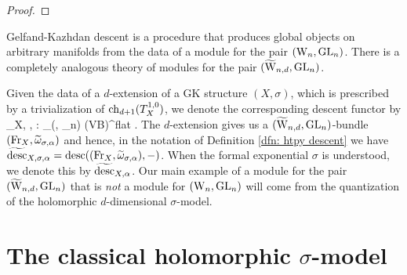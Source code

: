 \begin{proof}
\end{proof}

Gelfand-Kazhdan descent is a procedure that produces global objects on arbitrary manifolds from the data of a module for the pair $({{\rm W}_n}, {\rm GL}_n)$. 
There is a completely analogous theory of modules for the pair $(\widetilde{\rm W}_{n,d}, {\rm GL}_n)$. 

Given the data of a $d$-extension of a GK structure $(X, \sigma)$, which is prescribed by a trivialization of ${\rm ch}_{d+1}(T_X^{1,0})$, we denote the corresponding descent functor by
\ben
\Tilde{\desc}_{X, \sigma, \alpha} : \Mod_{(\TVectd, \GL_n)} (VB)^{flat} .
\een
The $d$-extension gives us a $(\widetilde{\rm W}_{n,d},{\rm GL}_n)$-bundle $({\rm Fr}_X, \widetilde{\omega}_{\sigma,\alpha})$ and hence, in the notation of Definition \ref{dfn: htpy descent} we have $\widetilde{{\rm desc}}_{X, \sigma, \alpha} = {\rm desc}(({\rm Fr}_X, \widetilde{\omega}_{\sigma, \alpha}), -)$.
When the formal exponential $\sigma$ is understood, we denote this by $\widetilde{{\rm desc}}_{X,\alpha}$. 
Our main example of a module for the pair $(\widetilde{\rm W}_{n,d}, {\rm GL}_n)$ that is {\em not} a module for $({{\rm W}_n}, {\rm GL}_n)$ will come from the quantization of the holomorphic $d$-dimensional $\sigma$-model.

\section{The classical holomorphic $\sigma$-model}

